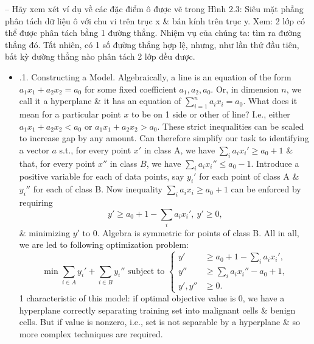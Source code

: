 \documentclass{article}
\begin{document}
\begin{itemize}
\begin{itemize}
        -- Hãy xem xét ví dụ về các đặc điểm ô được vẽ trong {\sf Hình 2.3: Siêu mặt phẳng phân tách dữ liệu ô} với chu vi trên trục x \& bán kính trên trục y. Xem: 2 lớp có thể được phân tách bằng 1 đường thẳng. Nhiệm vụ của chúng ta: tìm ra đường thẳng đó. Tất nhiên, có 1 số đường thẳng hợp lệ, nhưng, như lần thử đầu tiên, bất kỳ đường thẳng nào phân tách 2 lớp đều được.
        \begin{itemize}
            \item {.1. Constructing a Model.} Algebraically, a line is an equation of the form $a_1x_1 + a_2x_2 = a_0$ for some fixed coefficient $a_1,a_2,a_0$. Or, in dimension $n$, we call it a hyperplane \& it has an equation of $\sum_{i=1}^n a_ix_i = a_0$. What does it mean for a particular point $x$ to be on 1 side or other of line? I.e., either $a_1x_1 + a_2x_2 < a_0$ or $a_1x_1 + a_2x_2 > a_0$. These strict inequalities can be scaled to increase gap by any amount. Can therefore simplify our task to identifying a vector $a$ s.t., for every point $x'$ in class A, we have $\sum_i a_ix_i'\ge a_0 + 1$ \& that, for every point $x''$ in class $B$, we have $\sum_i a_ix_i''\le a_0 - 1$. Introduce a positive variable for each of data points, say $y_i'$ for each point of class A \& $y_i''$ for each of class B. Now inequality $\sum_i a_ix_i\ge a_0 + 1$ can be enforced by requiring
            \begin{equation*}
                y'\ge a_0 + 1 - \sum_i a_ix_i',\ y'\ge0,
            \end{equation*}
            \& minimizing $y'$ to 0. Algebra is symmetric for points of class B. All in all, we are led to following optimization problem:
            \begin{equation*}
                \min\sum_{i\in A} y_i' + \sum_{i\in B} y_i''\mbox{ subject to }\left\{\begin{split}
                    y'&\ge a_0 + 1 - \sum_i a_ix_i',\\
                    y''&\ge\sum_i a_ix_i'' - a_0 + 1,\\
                    y',y''&\ge0.
                \end{split}\right.
            \end{equation*}
            1 characteristic of this model: if optimal objective value is 0, we have a hyperplane correctly separating training set into malignant cells \& benign cells. But if value is nonzero, i.e., set is not separable by a hyperplane \& so more complex techniques are required.


\end{itemize}
\end{itemize}
\end{itemize}
\end{document}
